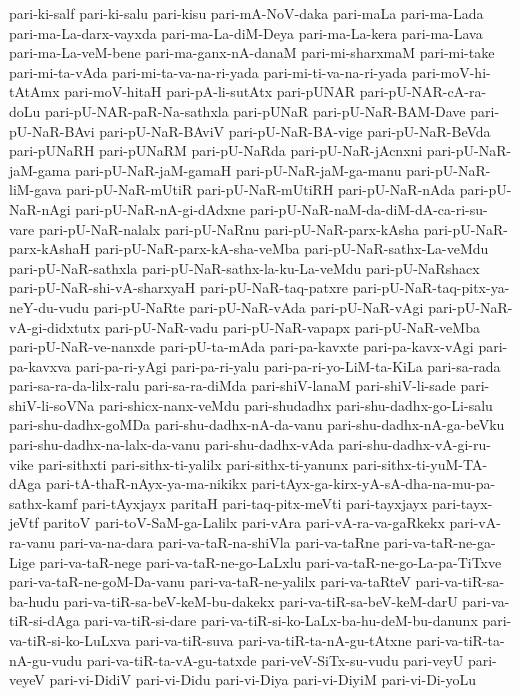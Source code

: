 {pari-ki-salf
pari-ki-salu
pari-kisu
pari-mA-NoV-daka
pari-maLa
pari-ma-Lada
pari-ma-La-darx-vayxda
pari-ma-La-diM-Deya
pari-ma-La-kera
pari-ma-Lava
pari-ma-La-veM-bene
pari-ma-ganx-nA-danaM
pari-mi-sharxmaM
pari-mi-take
pari-mi-ta-vAda
pari-mi-ta-va-na-ri-yada
pari-mi-ti-va-na-ri-yada
pari-moV-hi-tAtAmx
pari-moV-hitaH
pari-pA-li-sutAtx
pari-pUNAR
pari-pU-NAR-cA-ra-doLu
pari-pU-NAR-paR-Na-sathxla
pari-pUNaR
pari-pU-NaR-BAM-Dave
pari-pU-NaR-BAvi
pari-pU-NaR-BAviV
pari-pU-NaR-BA-vige
pari-pU-NaR-BeVda
pari-pUNaRH
pari-pUNaRM
pari-pU-NaRda
pari-pU-NaR-jAcnxni
pari-pU-NaR-jaM-gama
pari-pU-NaR-jaM-gamaH
pari-pU-NaR-jaM-ga-manu
pari-pU-NaR-liM-gava
pari-pU-NaR-mUtiR
pari-pU-NaR-mUtiRH
pari-pU-NaR-nAda
pari-pU-NaR-nAgi
pari-pU-NaR-nA-gi-dAdxne
pari-pU-NaR-naM-da-diM-dA-ca-ri-su-vare
pari-pU-NaR-nalalx
pari-pU-NaRnu
pari-pU-NaR-parx-kAsha
pari-pU-NaR-parx-kAshaH
pari-pU-NaR-parx-kA-sha-veMba
pari-pU-NaR-sathx-La-veMdu
pari-pU-NaR-sathxla
pari-pU-NaR-sathx-la-ku-La-veMdu
pari-pU-NaRshacx
pari-pU-NaR-shi-vA-sharxyaH
pari-pU-NaR-taq-patxre
pari-pU-NaR-taq-pitx-ya-neY-du-vudu
pari-pU-NaRte
pari-pU-NaR-vAda
pari-pU-NaR-vAgi
pari-pU-NaR-vA-gi-didxtutx
pari-pU-NaR-vadu
pari-pU-NaR-vapapx
pari-pU-NaR-veMba
pari-pU-NaR-ve-nanxde
pari-pU-ta-mAda
pari-pa-kavxte
pari-pa-kavx-vAgi
pari-pa-kavxva
pari-pa-ri-yAgi
pari-pa-ri-yalu
pari-pa-ri-yo-LiM-ta-KiLa
pari-sa-rada
pari-sa-ra-da-lilx-ralu
pari-sa-ra-diMda
pari-shiV-lanaM
pari-shiV-li-sade
pari-shiV-li-soVNa
pari-shicx-nanx-veMdu
pari-shudadhx
pari-shu-dadhx-go-Li-salu
pari-shu-dadhx-goMDa
pari-shu-dadhx-nA-da-vanu
pari-shu-dadhx-nA-ga-beVku
pari-shu-dadhx-na-lalx-da-vanu
pari-shu-dadhx-vAda
pari-shu-dadhx-vA-gi-ru-vike
pari-sithxti
pari-sithx-ti-yalilx
pari-sithx-ti-yanunx
pari-sithx-ti-yuM-TA-dAga
pari-tA-thaR-nAyx-ya-ma-nikikx
pari-tAyx-ga-kirx-yA-sA-dha-na-mu-pa-sathx-kamf
pari-tAyxjayx
paritaH
pari-taq-pitx-meVti
pari-tayxjayx
pari-tayx-jeVtf
paritoV
pari-toV-SaM-ga-Lalilx
pari-vAra
pari-vA-ra-va-gaRkekx
pari-vA-ra-vanu
pari-va-na-dara
pari-va-taR-na-shiVla
pari-va-taRne
pari-va-taR-ne-ga-Lige
pari-va-taR-nege
pari-va-taR-ne-go-LaLxlu
pari-va-taR-ne-go-La-pa-TiTxve
pari-va-taR-ne-goM-Da-vanu
pari-va-taR-ne-yalilx
pari-va-taRteV
pari-va-tiR-sa-ba-hudu
pari-va-tiR-sa-beV-keM-bu-dakekx
pari-va-tiR-sa-beV-keM-darU
pari-va-tiR-si-dAga
pari-va-tiR-si-dare
pari-va-tiR-si-ko-LaLx-ba-hu-deM-bu-danunx
pari-va-tiR-si-ko-LuLxva
pari-va-tiR-suva
pari-va-tiR-ta-nA-gu-tAtxne
pari-va-tiR-ta-nA-gu-vudu
pari-va-tiR-ta-vA-gu-tatxde
pari-veV-SiTx-su-vudu
pari-veyU
pari-veyeV
pari-vi-DidiV
pari-vi-Didu
pari-vi-Diya
pari-vi-DiyiM
pari-vi-Di-yoLu
}
